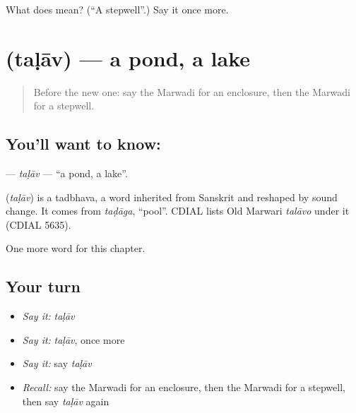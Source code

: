 \begin{tcolorbox}[breakable,colback=teal!4,colframe=teal!35!black,title={Before you move on}]
What does  mean? (\textquotedblleft{}A stepwell\textquotedblright{}.) Say it once more.
\end{tcolorbox}
\section[\texorpdfstring{\mw{तळाव} (taḷāv)}{तळाव (taḷāv)}]{ (taḷāv) — a pond, a lake}

\label{lesson:MW-C99-talav}



\begin{quote}
Before the new one: say the Marwadi for an enclosure, then the Marwadi for a stepwell.
\end{quote}

\subsection*{You'll want to know: }
\textbf{} — \emph{taḷāv} — \textquotedblleft{}a pond, a lake\textquotedblright{}.

\begin{cousinweb}
\textbf{} (\emph{taḷāv}) is a tadbhava, a word inherited from Sanskrit and reshaped by sound change. It comes from \emph{taḍāga}, \textquotedblleft{}pool\textquotedblright{}. CDIAL lists Old Marwari \emph{talāvo} under it (CDIAL 5635).
\end{cousinweb}

\begin{grammarlens}[title={What you've built}]
One more word for this chapter.
\end{grammarlens}

\subsection*{Your turn}
\begin{itemize}
\raggedright
  \item \emph{Say it:} \emph{taḷāv}
  \item \emph{Say it:} \emph{taḷāv}, once more
  \item \emph{Say it:} say \emph{taḷāv}
  \item \emph{Recall:} say the Marwadi for an enclosure, then the Marwadi for a stepwell, then say \emph{taḷāv} again
\end{itemize}

